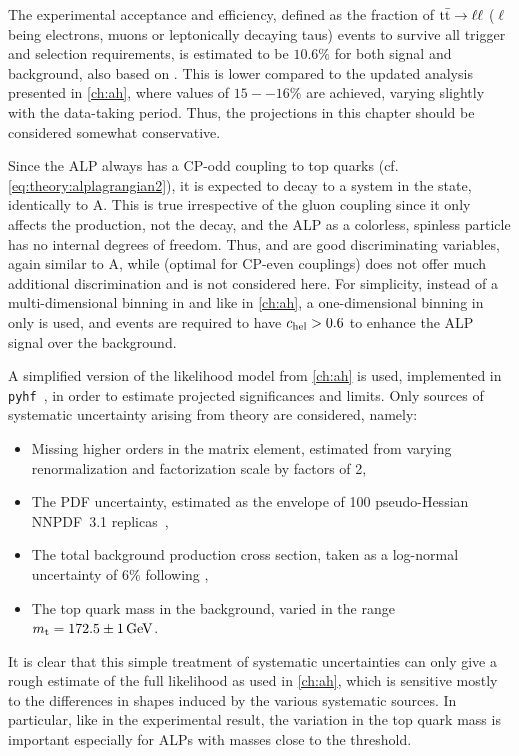 The experimental acceptance and efficiency, defined as the fraction of $\mathrm{t \bar{t}} \rightarrow \ell\ell$ ($\ell$ being electrons, muons or leptonically decaying taus) events to survive all trigger and selection requirements, is estimated to be $10.6\%$ for both signal and \ttbar background, also based on . This is lower compared to the updated analysis presented in \cref{ch:ah}, where values of $15--16\%$ are achieved, varying slightly with the data-taking period. Thus, the projections in this chapter should be considered somewhat conservative.

Since the ALP always has a CP-odd coupling to top quarks (cf. \cref{eq:theory:alplagrangian2}), it is expected to decay to a \ttbar system in the  state, identically to A. This is true irrespective of the gluon coupling \cG since it only affects the production, not the decay, and the ALP as a colorless, spinless particle has no internal degrees of freedom. Thus, \mtt and \chel are good discriminating variables, again similar to A, while \chan (optimal for CP-even couplings) does not offer much additional discrimination and is not considered here. For simplicity, instead of a multi-dimensional binning in \mtt and \chel like in \cref{ch:ah}, a one-dimensional binning in \mtt only is used, and events are required to have $c_{\mathrm{hel}} > 0.6$ to enhance the ALP signal over the background.

A simplified version of the likelihood model from \cref{ch:ah} is used, implemented in \texttt{pyhf}~\cite{pyhf_joss}, in order to estimate projected significances and limits. Only sources of systematic uncertainty arising from theory are considered, namely:

\begin{itemize}
    \item Missing higher orders in the matrix element, estimated from varying renormalization and factorization scale by factors of 2,
    \item The PDF uncertainty, estimated as the envelope of 100 pseudo-Hessian NNPDF~3.1 replicas~\cite{NNPDF:2017mvq},
    \item The total \ttbar background production cross section, taken as a log-normal uncertainty of $6\%$ following ,
    \item The top quark mass in the \ttbar background, varied in the range $\mt = 172.5 \pm 1 \, \si{\GeV}$.
\end{itemize}

It is clear that this simple treatment of systematic uncertainties can only give a rough estimate of the full likelihood as used in \cref{ch:ah}, which is sensitive mostly to the differences in shapes induced by the various systematic sources.
In particular, like in the experimental result, the variation in the top quark mass is important especially for ALPs with masses close to the \ttbar threshold.

